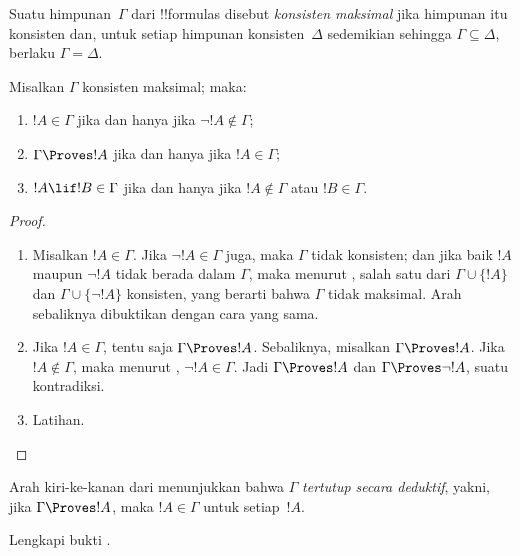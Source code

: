 \documentclass[../../../include/open-logic-section]{subfiles}
\begin{document}


\begin{defn}
Suatu himpunan~$\Gamma$ dari !!{formula}s disebut \emph{konsisten maksimal}
jika himpunan itu konsisten dan, untuk setiap himpunan konsisten~$\Delta$
sedemikian sehingga $\Gamma \subseteq \Delta$, berlaku $\Gamma = \Delta$.
\end{defn}

\begin{lem}
Misalkan $\Gamma$ konsisten maksimal; maka:
\begin{enumerate}
\item {} $!A \in \Gamma$ jika dan hanya jika $\lnot !A
  \notin \Gamma$;
\item {} $\Gamma \Proves !A$ jika dan hanya jika $!A \in
  \Gamma$;
\item {} $!A \lif !B \in \Gamma$ jika dan hanya jika
  $!A \notin \Gamma$ atau $!B \in \Gamma$.
\end{enumerate}
\end{lem}

\begin{proof}
\begin{enumerate}
\item Misalkan $!A \in \Gamma$. Jika $\lnot !A \in \Gamma$ juga, maka
  $\Gamma$ tidak konsisten; dan jika baik $!A$ maupun $\lnot!A$ tidak berada
  dalam $\Gamma$, maka menurut , salah satu dari
  $\Gamma\cup\{!A\}$ dan $\Gamma \cup \{\lnot !A\}$ konsisten, yang berarti
  bahwa $\Gamma$ tidak maksimal. Arah sebaliknya dibuktikan dengan cara yang
  sama.
\item Jika $!A \in \Gamma$, tentu saja $\Gamma \Proves !A$. Sebaliknya,
  misalkan $\Gamma \Proves !A$. Jika $!A \notin \Gamma$, maka menurut
  , $\lnot !A \in \Gamma$. Jadi $\Gamma \Proves !A$ dan
  $\Gamma \Proves \lnot !A$, suatu kontradiksi.
\item Latihan.
\end{enumerate}
\end{proof}

Arah kiri-ke-kanan dari  menunjukkan
bahwa $\Gamma$ \emph{tertutup secara deduktif}, yakni, jika $\Gamma \Proves
!A$, maka $!A \in \Gamma$ untuk setiap~$!A$.

\begin{prob}
  Lengkapi bukti .
\end{prob}
\end{document}
